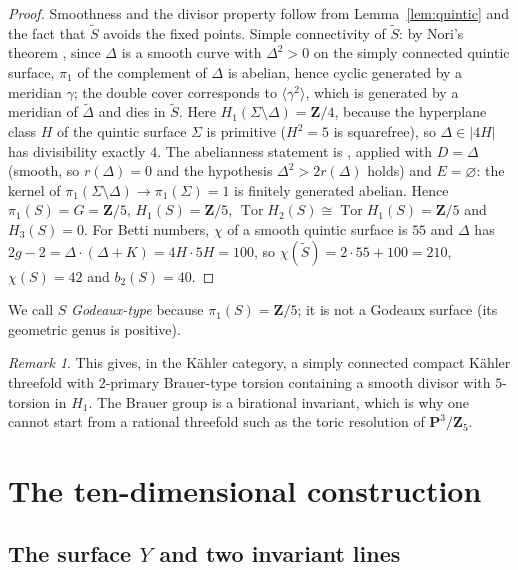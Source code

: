 \documentclass[11pt]{amsart}
\numberwithin{equation}{section}
\theoremstyle{definition}
\theoremstyle{remark}
\newtheorem{remark}[theorem]{Remark}
\newcommand{\Z}{\mathbf Z}
\newcommand{\PP}{\mathbf P}
\DeclareMathOperator{\Tor}{Tor}
\begin{document}
\begin{proof}
Smoothness and the divisor property follow from Lemma~\ref{lem:quintic}
and the fact that $\widetilde S$ avoids the fixed points. Simple
connectivity of $\widetilde S$: by Nori's theorem \cite{Nori1983}, since
$\Delta$ is a smooth curve with $\Delta^2>0$ on the simply connected
quintic surface, $\pi_1$ of the complement of $\Delta$ is abelian, hence
cyclic generated by a meridian $\gamma$; the double cover corresponds to
$\langle\gamma^2\rangle$, which is generated by a meridian of
$\widetilde\Delta$ and dies in $\widetilde S$. Here
$H_1(\Sigma\setminus\Delta)=\Z/4$, because the hyperplane class $H$ of the
quintic surface $\Sigma$ is primitive ($H^2=5$ is squarefree), so
$\Delta\in|4H|$ has divisibility exactly $4$. The abelianness statement is
\cite[Prop.~3.27]{Nori1983}, applied with $D=\Delta$ (smooth, so
$r(\Delta)=0$ and the hypothesis $\Delta^2>2r(\Delta)$ holds) and
$E=\varnothing$: the kernel of $\pi_1(\Sigma\setminus\Delta)\to\pi_1(\Sigma)
=1$ is finitely generated abelian.
Hence $\pi_1(S)=G=\Z/5$, $H_1(S)=\Z/5$, $\Tor H_2(S)\cong\Tor H_1(S)=\Z/5$
and $H_3(S)=0$. For Betti numbers, $\chi$ of a smooth quintic surface is
$55$ and $\Delta$ has $2g-2=\Delta\cdot(\Delta+K)=4H\cdot5H=100$, so
$\chi(\widetilde S)=2\cdot55+100=210$, $\chi(S)=42$ and $b_2(S)=40$.
\end{proof}

We call $S$ \emph{Godeaux-type} because $\pi_1(S)=\Z/5$; it is not a
Godeaux surface (its geometric genus is positive).

\begin{remark}
This gives, in the K\"ahler category, a simply connected compact K\"ahler threefold with $2$-primary
Brauer-type torsion containing a smooth divisor with $5$-torsion in $H_1$.
The Brauer group is a birational invariant, which is why one cannot start
from a rational threefold such as the toric resolution of $\PP^3/\Z_5$.
\end{remark}

\section{The ten-dimensional construction}\label{sec:ten}

\subsection{The surface $Y$ and two invariant lines}
\end{document}
